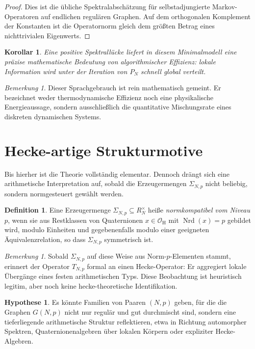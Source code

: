 \documentclass[12pt,a4paper]{article}
\theoremstyle{plain}
\newtheorem{korollar}[satz]{Korollar}
\theoremstyle{definition}
\newtheorem{definition}[satz]{Definition}
\newtheorem{hypothese}[satz]{Hypothese}
\theoremstyle{remark}
\newtheorem{bemerkung}[satz]{Bemerkung}
\newcommand{\OH}{\mathcal{O}_{\mathrm H}}
\newcommand{\RN}{R_N}
\newcommand{\SNp}{\Sigma_{N,p}}
\newcommand{\GNp}{G(N,p)}
\newcommand{\TNp}{T_{N,p}}
\newcommand{\PN}{P_N}
\begin{document}
\begin{proof}
Dies ist die übliche Spektralabschätzung für selbstadjungierte Markov-Operatoren auf endlichen regulären Graphen. Auf dem orthogonalen Komplement der Konstanten ist die Operatornorm gleich dem größten Betrag eines nichttrivialen Eigenwerts.
\end{proof}

\begin{korollar}
Eine positive Spektrallücke liefert in diesem Minimalmodell eine präzise mathematische Bedeutung von \emph{algorithmischer Effizienz}: lokale Information wird unter der Iteration von \(\PN\) schnell global verteilt.
\end{korollar}

\begin{bemerkung}
Dieser Sprachgebrauch ist rein mathematisch gemeint. Er bezeichnet weder thermodynamische Effizienz noch eine physikalische Energieaussage, sondern ausschließlich die quantitative Mischungsrate eines diskreten dynamischen Systems.
\end{bemerkung}

\section{Hecke-artige Strukturmotive}
Bis hierher ist die Theorie vollständig elementar. Dennoch drängt sich eine arithmetische Interpretation auf, sobald die Erzeugermengen \(\SNp\) nicht beliebig, sondern normgesteuert gewählt werden.

\begin{definition}
Eine Erzeugermenge \(\SNp\subseteq \RN^\times\) heiße \emph{normkompatibel vom Niveau \(p\)}, wenn sie aus Restklassen von Quaternionen \(x\in\OH\) mit \(\operatorname{Nrd}(x)=p\) gebildet wird, modulo Einheiten und gegebenenfalls modulo einer geeigneten Äquivalenzrelation, so dass \(\SNp\) symmetrisch ist.
\end{definition}

\begin{bemerkung}
Sobald \(\SNp\) auf diese Weise aus Norm-\(p\)-Elementen stammt, erinnert der Operator \(\TNp\) formal an einen Hecke-Operator: Er aggregiert lokale Übergänge eines festen arithmetischen Typs. Diese Beobachtung ist heuristisch legitim, aber noch keine hecke-theoretische Identifikation.
\end{bemerkung}

\begin{hypothese}
Es könnte Familien von Paaren \((N,p)\) geben, für die die Graphen \(\GNp\) nicht nur regulär und gut durchmischt sind, sondern eine tieferliegende arithmetische Struktur reflektieren, etwa in Richtung automorpher Spektren, Quaternionenalgebren über lokalen Körpern oder expliziter Hecke-Algebren.
\end{hypothese}
\end{document}
